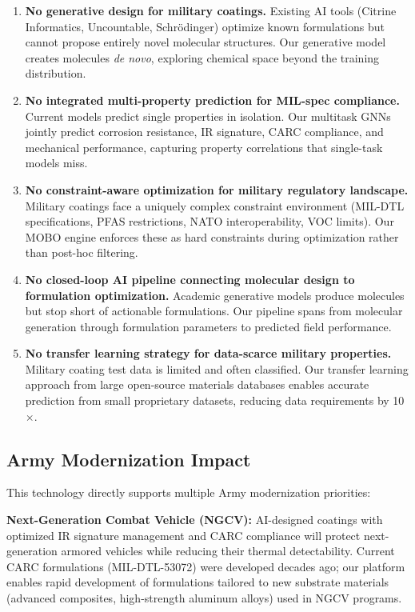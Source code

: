 \documentclass[11pt,letterpaper]{article}
\begin{document}
\begin{enumerate}[nosep]
  \item \textbf{No generative design for military coatings.} Existing AI tools (Citrine Informatics, Uncountable, Schr\"odinger) optimize known formulations but cannot propose entirely novel molecular structures. Our generative model creates molecules \textit{de novo}, exploring chemical space beyond the training distribution.

  \item \textbf{No integrated multi-property prediction for MIL-spec compliance.} Current models predict single properties in isolation. Our multitask GNNs jointly predict corrosion resistance, IR signature, CARC compliance, and mechanical performance, capturing property correlations that single-task models miss.

  \item \textbf{No constraint-aware optimization for military regulatory landscape.} Military coatings face a uniquely complex constraint environment (MIL-DTL specifications, PFAS restrictions, NATO interoperability, VOC limits). Our MOBO engine enforces these as hard constraints during optimization rather than post-hoc filtering.

  \item \textbf{No closed-loop AI pipeline connecting molecular design to formulation optimization.} Academic generative models produce molecules but stop short of actionable formulations. Our pipeline spans from molecular generation through formulation parameters to predicted field performance.

  \item \textbf{No transfer learning strategy for data-scarce military properties.} Military coating test data is limited and often classified. Our transfer learning approach from large open-source materials databases enables accurate prediction from small proprietary datasets, reducing data requirements by 10$\times$.
\end{enumerate}

\subsection{Army Modernization Impact}

This technology directly supports multiple Army modernization priorities:

\textbf{Next-Generation Combat Vehicle (NGCV):} AI-designed coatings with optimized IR signature management and CARC compliance will protect next-generation armored vehicles while reducing their thermal detectability. Current CARC formulations (MIL-DTL-53072) were developed decades ago; our platform enables rapid development of formulations tailored to new substrate materials (advanced composites, high-strength aluminum alloys) used in NGCV programs.
\end{document}
